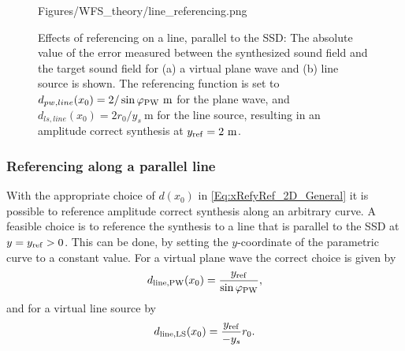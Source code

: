 \begin{figure}
	\centering
	\begin{overpic}[width = .85\columnwidth ]{Figures/WFS_theory/line_referencing.png}
	\scriptsize
	\end{overpic}
\caption{Effects of referencing on a line, parallel to the SSD: The absolute value of the error measured between the synthesized sound field and the target sound field for (a) a virtual plane wave and (b) line source is shown. The referencing function is set to $d_{pw,line}(x_0) = 2 / \sin\varphi_\text{PW} ~\mathrm{m}$ for the plane wave, and $d_{ls,line}(x_0) = 2 r_0/y_s ~\mathrm{m}$ for the line source, resulting in an amplitude correct synthesis at $y_{\mathrm{ref}} = 2~\mathrm{m}$.}
	\label{Fig:Theory:line_referencing}
\end{figure}
\subsubsection{Referencing along a parallel line}
With the appropriate choice of $d(x_0)$ in \eqref{Eq:xRefyRef_2D_General} it is possible to reference amplitude correct synthesis along an arbitrary curve. A feasible choice is to reference the synthesis to a line that is parallel to the SSD at $y=y_{\mathrm{ref}}>0$. This can be done, by setting the $y$-coordinate of the parametric curve to a constant value.
For a virtual plane wave the correct choice is given by
\begin{equation}
d_\text{line,PW}(x_0) = \frac{y_{\mathrm{ref}}}{\sin\varphi_\text{PW}},
\end{equation}
and for a virtual line source by
\begin{equation}
d_\text{line,LS}(x_0) = \frac{y_{\mathrm{ref}}}{-y_s} r_0.
\end{equation}

